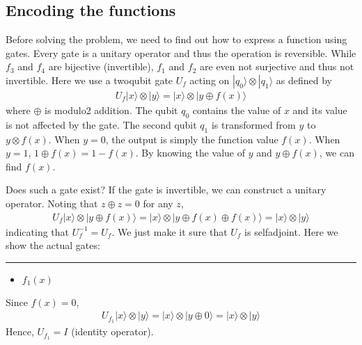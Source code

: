 \documentclass[letterpaper,10pt,english]{jupyterBook}
\begin{document}
\subsection{Encoding the functions}
\label{\detokenize{algorithms/deutsch:encoding-the-functions}}
\sphinxAtStartPar
Before solving the problem, we need to find out how to express a function using gates.  Every gate is a unitary operator and thus the operation is reversible.  While \(f_3\) and \(f_4\) are bijective (invertible), \(f_1\) and \(f_2\) are even not surjective  and thus not invertible.  Here we use a two\sphinxhyphen{}qubit gate \(U_f\) acting on \(|q_0\rangle \otimes |q_1\rangle\) as defined by
\begin{equation*}
\begin{split}
U_f |x\rangle \otimes  |y\rangle = |x\rangle \otimes |y \oplus f(x)\rangle
\end{split}
\end{equation*}
\sphinxAtStartPar
where \(\oplus\) is modulo\sphinxhyphen{}2 addition.  The qubit \(q_0\) contains the value of \(x\) and its value is not affected by the gate.  The second qubit \(q_1\) is transformed from \(y\) to \(y \otimes f(x)\).  When \(y=0\), the output is simply the function value \(f(x)\).  When \(y=1\), \(1 \oplus f(x) = 1 - f(x)\).   By knowing the value of \(y\) and \(y \oplus f(x)\), we can find \(f(x)\).

\sphinxAtStartPar
Does such a gate exist?  If the gate is invertible, we can construct a unitary operator. Noting that \(z \oplus z = 0\) for any \(z\),
\begin{equation*}
\begin{split}
U_f |x\rangle \otimes |y \oplus f(x)\rangle = |x\rangle \otimes |y \oplus f(x) \oplus f(x)\rangle = |x\rangle \otimes |y \rangle
\end{split}
\end{equation*}
\sphinxAtStartPar
indicating that \(U_f^{-1} = U_f\).  We just make it sure that \(U_f\) is self\sphinxhyphen{}adjoint.  Here we show the actual gates:


\bigskip\hrule\bigskip

\begin{itemize}
\item {}
\sphinxAtStartPar
\(f_1(x)\)

\end{itemize}

\sphinxAtStartPar
Since \(f(x)=0\),
\begin{equation*}
\begin{split}
U_{f_1} |x\rangle \otimes |y\rangle =  |x\rangle \otimes |y \oplus 0\rangle = |x\rangle \otimes |y\rangle
\end{split}
\end{equation*}
\sphinxAtStartPar
Hence, \(U_{f_1} = I\)  (identity operator).
\end{document}
